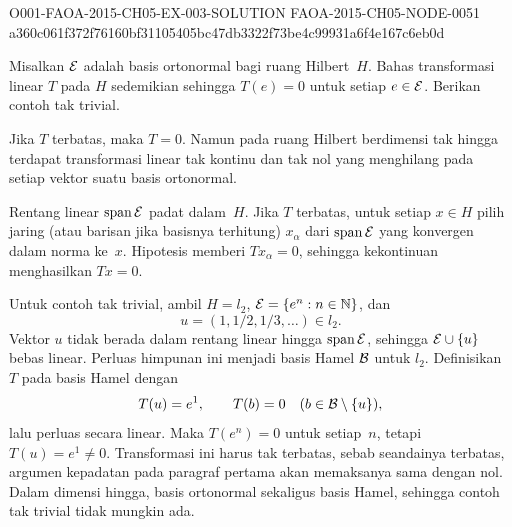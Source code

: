 \begin{o001solution}
  {O001-FAOA-2015-CH05-EX-003-SOLUTION}
  {FAOA-2015-CH05-NODE-0051}
  {a360c061f372f76160bf31105405bc47db3322f73be4c99931a6f4e167c6eb0d}
\begin{o001statement}
Misalkan $\mathcal{E}$ adalah basis ortonormal bagi ruang Hilbert~$H$. Bahas transformasi linear $T$ pada $H$
sedemikian sehingga $T(e) = 0$ untuk setiap $e \in \mathcal{E}$. Berikan contoh tak trivial.
\end{o001statement}
\begin{o001answer}
Jika $T$ terbatas, maka $T=0$. Namun pada ruang Hilbert berdimensi tak
hingga terdapat transformasi linear tak kontinu dan tak nol yang menghilang
pada setiap vektor suatu basis ortonormal.
\end{o001answer}
\begin{o001proof}
Rentang linear $\operatorname{span}\mathcal{E}$ padat dalam~$H$. Jika $T$ terbatas, untuk setiap
$x\in H$ pilih jaring (atau barisan jika basisnya terhitung) $x_\alpha$ dari
$\operatorname{span}\mathcal{E}$ yang konvergen dalam norma ke~$x$. Hipotesis memberi
$Tx_\alpha=0$, sehingga kekontinuan menghasilkan $Tx=0$.

Untuk contoh tak trivial, ambil $H=l_2$, $\mathcal{E}=\{e^n:n\in\mathbb{N}\}$, dan
\[
 u=(1,1/2,1/3,\ldots)\in l_2.
\]
Vektor $u$ tidak berada dalam rentang linear hingga $\operatorname{span}\mathcal{E}$, sehingga
$\mathcal{E}\cup\{u\}$ bebas linear. Perluas himpunan ini menjadi basis Hamel
$\mathcal{B}$ untuk $l_2$. Definisikan $T$ pada basis Hamel dengan
\[
 T(u)=e^1,\qquad T(b)=0\quad(b\in\mathcal{B}\setminus\{u\}),
\]
lalu perluas secara linear. Maka $T(e^n)=0$ untuk setiap~$n$, tetapi
$T(u)=e^1\neq0$. Transformasi ini harus tak terbatas, sebab seandainya
terbatas, argumen kepadatan pada paragraf pertama akan memaksanya sama
dengan nol. Dalam dimensi hingga, basis ortonormal sekaligus basis Hamel,
sehingga contoh tak trivial tidak mungkin ada.
\end{o001proof}
\end{o001solution}

